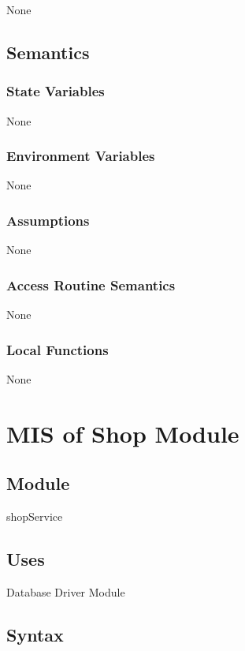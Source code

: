 \documentclass[12pt, titlepage]{article}
\begin{document}
None
\subsection{Semantics}

\subsubsection{State Variables}

None

\subsubsection{Environment Variables}

None

\subsubsection{Assumptions}

None

\subsubsection{Access Routine Semantics}

None

\subsubsection{Local Functions}

None

\newpage
\section{MIS of Shop Module} \label{mShop}
\subsection{Module}

shopService

\subsection{Uses}

Database Driver Module

\subsection{Syntax}
\end{document}
